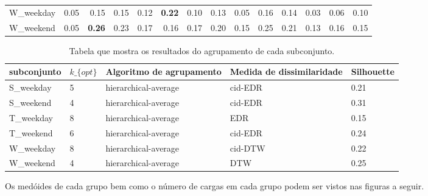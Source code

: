 \begin{center}
\begin{table}
{\begin{tabular}{lrrrrrrrrrrrrr}
	W\_weekday &                0.05 &                     0.15 &                     0.15 &                           0.12 &                         \bfseries{0.22} &                         0.10 &                               0.13 &                                 0.05 &                          0.16 &                          0.14 &                                0.03 &                                  0.06 &                             0.10 \\
	W\_weekend &                0.05 &                     \bfseries{0.26} &                     0.23 &                           0.17 &                         0.16 &                         0.17 &                               0.20 &                                 0.15 &                          0.25 &                          0.21 &                                0.13 &                                  0.16 &                             0.15 \\
	\bottomrule
\end{tabular}
	}
	\end{table}\label{tbl:valores_silhouette}
\end{center} 

\begin{center}
	\begin{table}
		\caption{Tabela que mostra os resultados do agrupamento de cada subconjunto.} 		
		\begin{tabular}{lllll}
			\toprule
			subconjunto & $k\_\{opt\}$ & Algoritmo de agrupamento & Medida de dissimilaridade & Silhouette \\
			\midrule
			 S\_weekday &       5 & hierarchical-average & cid-EDR & 0.21 \\
			 S\_weekend &       4 & hierarchical-average & cid-EDR & 0.31\\
			 T\_weekday &       8 & hierarchical-average & EDR & 0.15 \\
			 T\_weekend &       6 & hierarchical-average & cid-EDR & 0.24 \\
			 W\_weekday &       8 & hierarchical-average & cid-DTW & 0.22 \\
			 W\_weekend &       4 & hierarchical-average & DTW & 0.25\\
			\bottomrule
		\end{tabular}	
	\end{table}\label{tbl:resultados_finais_agrupamento}
\end{center} 

Os medóides de cada grupo bem como o número de cargas em cada grupo podem ser vistos nas figuras a seguir.

